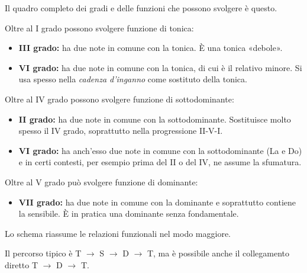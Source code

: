 Il quadro completo dei gradi e delle funzioni che possono svolgere è questo.

\begin{definizione}
	\label{def:accordi_tonica}
	Oltre al I grado possono svolgere funzione di tonica:
	\begin{itemize}
		\item \textbf{III grado:} ha due note in comune con la tonica. È una tonica «debole».
		\item \textbf{VI grado:} ha due note in comune con la tonica, di cui è il relativo minore. Si usa spesso nella \textit{cadenza d'inganno} come sostituto della tonica.
	\end{itemize}
\end{definizione}

\begin{definizione}
	\label{def:accordi_sottodominante}
	Oltre al IV grado possono svolgere funzione di sottodominante:
	\begin{itemize}
		\item \textbf{II grado:} ha due note in comune con la sottodominante. Sostituisce molto spesso il IV grado, soprattutto nella progressione II-V-I.
		\item \textbf{VI grado:} ha anch'esso due note in comune con la sottodominante (La e Do) e in certi contesti, per esempio prima del II o del IV, ne assume la sfumatura.
	\end{itemize}
\end{definizione}

\begin{definizione}
	\label{def:accordi_dominante}
	Oltre al V grado può svolgere funzione di dominante:
	\begin{itemize}
		\item \textbf{VII grado:} ha due note in comune con la dominante e soprattutto contiene la sensibile. È in pratica una dominante senza fondamentale.
	\end{itemize}
\end{definizione}

Lo schema riassume le relazioni funzionali nel modo maggiore.

\begin{center}
\end{center}

Il percorso tipico è T $\rightarrow$ S $\rightarrow$ D $\rightarrow$ T, ma è possibile anche il collegamento diretto T $\rightarrow$ D $\rightarrow$ T.
